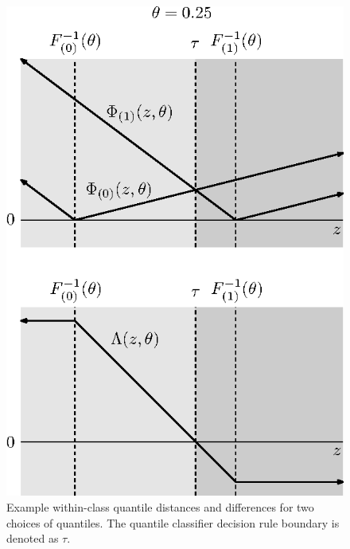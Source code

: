\begin{figure}[h]
  \label{fig:phi-lambda}
  \caption[cccc]{Example within-class quantile distances and differences for two
    choices of quantiles.  The quantile classifier decision rule boundary is
    denoted as $\tau$.}
  \vspace{5mm}
  
  \begin{minipage}[t]{0.49\linewidth}
    \centering
    \includegraphics{phi-lambda-0-25}
  \end{minipage}
  \begin{minipage}[t]{0.49\linewidth}
    \centering

\end{minipage}
\end{figure}
